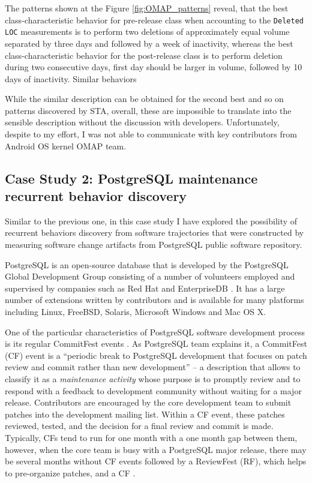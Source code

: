 The patterns shown at the Figure \ref{fig:OMAP_patterns} reveal, that the best class-characteristic behavior for pre-release class when accounting to the \texttt{Deleted LOC} measurements is to perform two deletions of approximately equal volume separated by three days and followed by a week of inactivity, whereas the best class-characteristic behavior for the post-release class is to perform deletion during two consecutive days, first day should be larger in volume, followed by 10 days of inactivity. Similar behaviors 

While the similar description can be obtained for the second best and so on patterns discovered by STA, overall, these are impossible to translate into the sensible description without the discussion with developers. Unfortunately, despite to my effort, I was not able to communicate with key contributors from Android OS kernel OMAP team.
\clearpage

\subsection{Case Study 2: PostgreSQL maintenance recurrent behavior discovery}
Similar to the previous one, in this case study I have explored the possibility of recurrent behaviors discovery from software trajectories that were constructed by measuring software change artifacts from PostgreSQL public software repository. 

PostgreSQL is an open-source database that is developed by the PostgreSQL Global Development Group consisting of a number of volunteers employed and supervised by companies such as Red Hat and EnterpriseDB \cite{postgre-contrib}. It has a large number of extensions written by contributors and is available for many platforms including Linux, FreeBSD, Solaris, Microsoft Windows and Mac OS X.

One of the particular characteristics of PostgreSQL software development process is its regular CommitFest events \cite{postgre-commitfest}. As PostgreSQL team explains it, a CommitFest (CF) event is a ``periodic break to PostgreSQL development that focuses on patch review and commit rather than new development'' -- a description that allows to classify it as a \textit{maintenance activity} whose purpose is to promptly review and to respond with a feedback to development community without waiting for a major release. Contributors are encouraged by the core development team to submit patches into the development mailing list. Within a CF event, these patches reviewed, tested, and the decision for a final review and commit is made.  Typically, CFs tend to run for one month with a one month gap between them, however, when the core team is busy with a PostgreSQL major release, there may be several months without CF events followed by a ReviewFest (RF), which helps to pre-organize patches, and a CF . 

